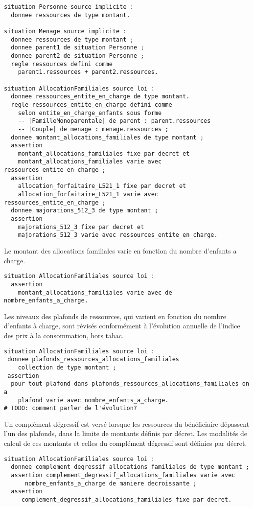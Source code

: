 \documentclass[11pt, french]{article}
\begin{document}
\begin{lstlisting}
situation Personne source implicite :
  donnee ressources de type montant.

situation Menage source implicite :
  donnee ressources de type montant ;
  donnee parent1 de situation Personne ;
  donnee parent2 de situation Personne ;
  regle ressources defini comme
    parent1.ressources + parent2.ressources.

situation AllocationFamiliales source loi :
  donnee ressources_entite_en_charge de type montant.
  regle ressources_entite_en_charge defini comme
    selon entite_en_charge_enfants sous forme
    -- |FamilleMonoparentale| de parent : parent.ressources
    -- |Couple| de menage : menage.ressources ;
  donnee montant_allocations_familiales de type montant ;
  assertion
    montant_allocations_familiales fixe par decret et
    montant_allocations_familiales varie avec ressources_entite_en_charge ;
  assertion
    allocation_forfaitaire_L521_1 fixe par decret et
    allocation_forfaitaire_L521_1 varie avec ressources_entite_en_charge ;
  donnee majorations_512_3 de type montant ;
  assertion
    majorations_512_3 fixe par decret et
    majorations_512_3 varie avec ressources_entite_en_charge.
\end{lstlisting}
Le montant des allocations familiales varie en fonction du nombre d'enfants a charge.
\begin{lstlisting}
situation AllocationFamiliales source loi :
  assertion
    montant_allocations_familiales varie avec de nombre_enfants_a_charge.
\end{lstlisting}
Les niveaux des plafonds de ressources, qui varient en fonction du nombre d'enfants à charge, sont révisés conformément à l'évolution annuelle de l'indice des prix à la consommation, hors tabac.
\begin{lstlisting}
situation AllocationFamiliales source loi :
 donnee plafonds_ressources_allocations_familiales
    collection de type montant ;
 assertion
  pour tout plafond dans plafonds_ressources_allocations_familiales on a
    plafond varie avec nombre_enfants_a_charge.
# TODO: comment parler de l'évolution?
\end{lstlisting}
Un complément dégressif est versé lorsque les ressources du bénéficiaire dépassent l'un des plafonds, dans la limite de montants définis par décret. Les modalités de calcul de ces montants et celles du complément dégressif sont définies par décret.
\begin{lstlisting}
situation AllocationFamiliales source loi :
  donnee complement_degressif_allocations_familiales de type montant ;
  assertion complement_degressif_allocations_familiales varie avec
      nombre_enfants_a_charge de maniere decroissante ;
  assertion
     complement_degressif_allocations_familiales fixe par decret.
\end{lstlisting}
\end{document}

